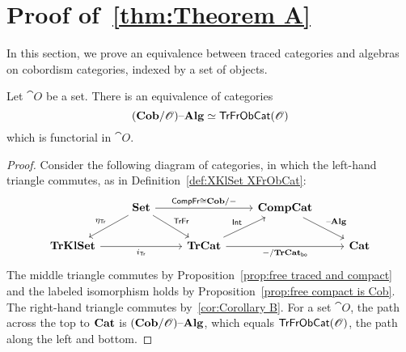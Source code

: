 \documentclass[12pt,oneside,article,draft]{memoir}
\begin{document}
\section{Proof of~\ref{thm:Theorem A}}\label{sec:proof of A}

In this section, we prove an equivalence between traced categories and algebras on cobordism categories, indexed by a set of objects. 

\begin{proposition}\label{prop:natural equivalence cob-O and traced-O}
   Let $\cat{O}$ be a set.
   There is an equivalence of categories
      $$(\mathbf{Cob}/\mathscr{O}){\text \textendash}\mathbf{Alg}\simeq\mathsf{TrFrObCat}(\mathscr{O})$$
   which is functorial in $\cat{O}$.
\end{proposition}
\begin{proof}
   Consider the following diagram of categories, in which the left-hand triangle commutes, as in Definition~\ref{def:XKlSet XFrObCat}:
   $$
   \begin{tikzcd}
      &\Set\ar[rr,"\Fun{CompFr}\iso\Cob/-"]\ar[dl,"\eta_{\Fun{Tr}}"']\ar[dr,"\Fun{TrFr}"]&&\CompCat\ar[dr,"\alg"] \\
      \ncat{TrKlSet}\ar[rr,"i_{\Fun{Tr}}"']&&\TrCat\ar[ur,"\Fun{Int}"]\ar[rr,"-/\TrCat_{\bo}"']
         &&\Cat
   \end{tikzcd}
   $$
   The middle triangle commutes by Proposition~\ref{prop:free traced and compact} and the labeled isomorphism holds by Proposition~\ref{prop:free compact is Cob}.
   The right-hand triangle commutes by~\ref{cor:Corollary B}.
   For a set $\cat{O}$, the path across the top to $\mathbf{Cat}$ is $(\mathbf{Cob}/\mathscr{O}){\text \textendash}\mathbf{Alg}$, which equals $\mathsf{TrFrObCat}(\mathscr{O})$, the path along the left and bottom.
\end{proof}
\end{document}
